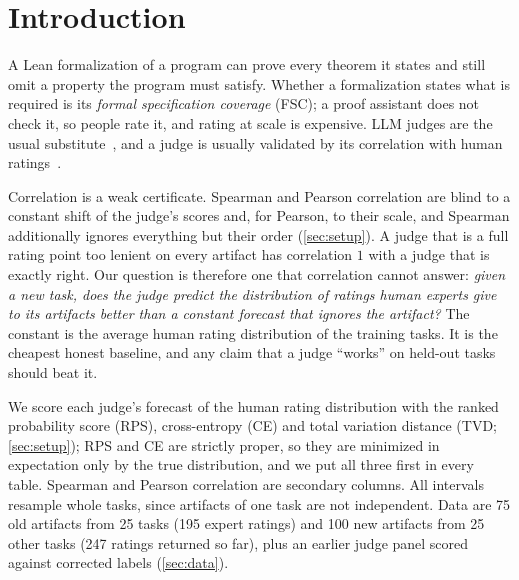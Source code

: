 \section{Introduction}
\label{sec:intro}
A Lean formalization of a program can prove every theorem it states and still omit a property the program must satisfy.
Whether a formalization states what is required is its \emph{formal specification coverage} (FSC); a proof assistant does not check it, so people rate it, and rating at scale is expensive.
LLM judges are the usual substitute~\citep{zheng2023judging,gu2024survey}, and a judge is usually validated by its correlation with human ratings~\citep{liu2023geval,kim2024prometheus}.

Correlation is a weak certificate.
Spearman and Pearson correlation are blind to a constant shift of the judge's scores and, for Pearson, to their scale, and Spearman additionally ignores everything but their order (\cref{sec:setup}).
A judge that is a full rating point too lenient on every artifact has correlation $1$ with a judge that is exactly right.
Our question is therefore one that correlation cannot answer: \emph{given a new task, does the judge predict the distribution of ratings human experts give to its artifacts better than a constant forecast that ignores the artifact?}
The constant is the average human rating distribution of the training tasks.
It is the cheapest honest baseline, and any claim that a judge ``works'' on held-out tasks should beat it.

We score each judge's forecast of the human rating distribution with the ranked probability score (RPS), cross-entropy (CE) and total variation distance (TVD; \cref{sec:setup}); RPS and CE are strictly proper, so they are minimized in expectation only by the true distribution, and we put all three first in every table.
Spearman and Pearson correlation are secondary columns.
All intervals resample whole tasks, since artifacts of one task are not independent.
Data are 75 old artifacts from 25 tasks (195 expert ratings) and 100 new artifacts from 25 other tasks (247 ratings returned so far), plus an earlier judge panel scored against corrected labels (\cref{sec:data}).

